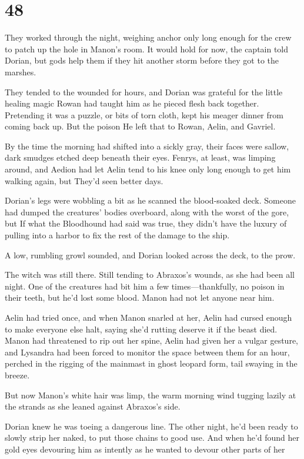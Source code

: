 
\chapter{48}

They worked through the night, weighing anchor only long enough for the crew to patch up the hole in Manon's room. It would hold for now, the captain told Dorian, but gods help them if they hit another storm before they got to the marshes.

They tended to the wounded for hours, and Dorian was grateful for the little healing magic Rowan had taught him as he pieced flesh back together. Pretending it was a puzzle, or bits of torn cloth, kept his meager dinner from coming back up. But the poison  He left that to Rowan, Aelin, and Gavriel.

By the time the morning had shifted into a sickly gray, their faces were sallow, dark smudges etched deep beneath their eyes. Fenrys, at least, was limping around, and Aedion had let Aelin tend to his knee only long enough to get him walking again, but  They'd seen better days.

Dorian's legs were wobbling a bit as he scanned the blood-soaked deck. Someone had dumped the creatures' bodies overboard, along with the worst of the gore, but  If what the Bloodhound had said was true, they didn't have the luxury of pulling into a harbor to fix the rest of the damage to the ship.

A low, rumbling growl sounded, and Dorian looked across the deck, to the prow.

The witch was still there. Still tending to Abraxos's wounds, as she had been all night. One of the creatures had bit him a few times---thankfully, no poison in their teeth, but  he'd lost some blood. Manon had not let anyone near him.

Aelin had tried once, and when Manon snarled at her, Aelin had cursed enough to make everyone else halt, saying she'd rutting deserve it if the beast died. Manon had threatened to rip out her spine, Aelin had given her a vulgar gesture, and Lysandra had been forced to monitor the space between them for an hour, perched in the rigging of the mainmast in ghost leopard form, tail swaying in the breeze.

But now  Manon's white hair was limp, the warm morning wind tugging lazily at the strands as she leaned against Abraxos's side.

Dorian knew he was toeing a dangerous line. The other night, he'd been ready to slowly strip her naked, to put those chains to good use. And when he'd found her gold eyes devouring him as intently as he wanted to devour other parts of her 

